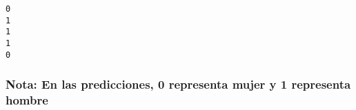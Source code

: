\documentclass[11pt]{article}
\makeatletter
\newcommand{\boxspacing}{\kern\kvtcb@left@rule\kern\kvtcb@boxsep}
\newcommand{\prompt}[4]{
        \ttfamily\llap{{\color{#2}[#3]:\hspace{3pt}#4}}\vspace{-\baselineskip}
    }
\makeatother
\begin{document}
    \begin{Verbatim}[commandchars=\\\{\}]
0
1
1
1
0
    \end{Verbatim}

    \hypertarget{nota-en-las-predicciones-0-representa-mujer-y-1-representa-hombre}{%
\subsubsection{Nota: En las predicciones, 0 representa mujer y 1
representa
hombre}\label{nota-en-las-predicciones-0-representa-mujer-y-1-representa-hombre}}

    \begin{tcolorbox}[breakable, size=fbox, boxrule=1pt, pad at break*=1mm,colback=cellbackground, colframe=cellborder]
\prompt{In}{incolor}{ }{\boxspacing}
\begin{Verbatim}[commandchars=\\\{\}]

\end{Verbatim}
\end{tcolorbox}


    
    
    
\end{document}
